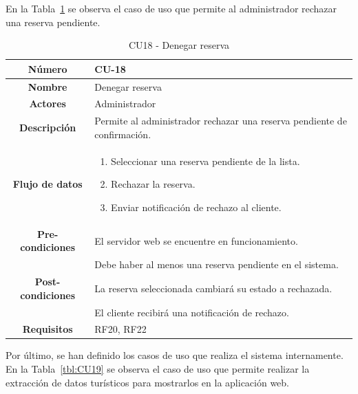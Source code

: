 En la Tabla~\ref{tbl:CU18} se observa el caso de uso que permite al administrador rechazar una reserva pendiente.
\begin{table}[h!tb]
	\centering
	\begin{adjustbox}{width=1\textwidth}
	\begin{tabular}{|c|p{\textwidth}|}
		\hline {\bf Número} & CU-18 \\
		\hline {\bf Nombre} & Denegar reserva\\
		\hline {\bf Actores} & Administrador \\
		\hline {\bf Descripción} & Permite al administrador rechazar una reserva pendiente de confirmación. \\
		\hline {\bf Flujo de datos}
		& 
		\begin{enumerate}
			\item Seleccionar una reserva pendiente de la lista.
			\item Rechazar la reserva.
			\item Enviar notificación de rechazo al cliente.
		\end{enumerate}\\
		\hline {\bf Pre-condiciones}
		& El servidor web se encuentre en funcionamiento. \\
		& Debe haber al menos una reserva pendiente en el sistema. \\
		\hline {\bf Post-condiciones}
		& La reserva seleccionada cambiará su estado a rechazada. \\
		& El cliente recibirá una notificación de rechazo. \\
		\hline {\bf Requisitos} & RF20, RF22 \\
		\hline 
	\end{tabular}
	\end{adjustbox}
	\caption{CU18 - Denegar reserva\label{tbl:CU18}}
\end{table}
Por último, se han definido los casos de uso que realiza el sistema internamente. 
En la Tabla~\ref{tbl:CU19} se observa el caso de uso que permite realizar la extracción de datos turísticos para mostrarlos en la aplicación web.
